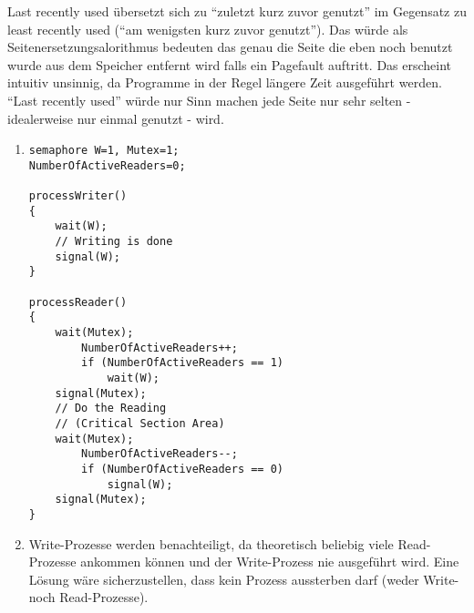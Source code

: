 \documentclass[ngerman]{fbi-aufgabenblatt}
\begin{document}
 Last recently used übersetzt sich zu ``zuletzt kurz zuvor genutzt'' im Gegensatz zu least recently used
 (``am wenigsten kurz zuvor genutzt''). Das würde als Seitenersetzungsalorithmus bedeuten das genau die
 Seite die eben noch benutzt wurde aus dem Speicher entfernt wird falls ein Pagefault auftritt.
 Das erscheint intuitiv unsinnig, da Programme in der Regel längere Zeit ausgeführt werden. ``Last recently
 used'' würde nur Sinn machen jede Seite nur sehr selten - idealerweise nur einmal genutzt - wird.
 

\begin{enumerate}
	\item

\begin{verbatim}
semaphore W=1, Mutex=1;
NumberOfActiveReaders=0;
 
processWriter()
{
    wait(W);
    // Writing is done
    signal(W);
}
 
processReader()
{
    wait(Mutex);
        NumberOfActiveReaders++;
        if (NumberOfActiveReaders == 1)
            wait(W);
    signal(Mutex);
    // Do the Reading
    // (Critical Section Area)
    wait(Mutex);
        NumberOfActiveReaders--;
        if (NumberOfActiveReaders == 0)
            signal(W);
    signal(Mutex);
}

\end{verbatim}

\item 
Write-Prozesse werden benachteiligt, da theoretisch beliebig viele Read-Prozesse ankommen können und der Write-Prozess nie ausgeführt wird. Eine Lösung wäre sicherzustellen, dass kein Prozess aussterben darf (weder Write- noch Read-Prozesse).

\end{enumerate}
\end{document}
